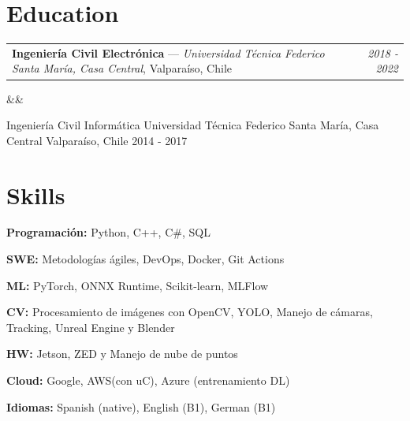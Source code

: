 \documentclass[11pt, letterpaper]{article}
\makeatletter
\newcommand{\project}[4]{%
  \noindent
  \begin{tabularx}{\linewidth}{@{}X r@{}}
    \textbf{#1} \hspace{4pt}{\small\textit{#2}} & \textit{#3}
  \end{tabularx}
  \vspace{0pt}
  #4
  \vspace{0pt}
}
\newcommand{\education}[5]{%
  \noindent
  \begin{tabularx}{\linewidth}{@{}X r@{}}
    \textbf{#1} — \textit{#2}, #3 & \textit{#4}
  \end{tabularx}
  \ifx&#5&\else{\small #5}\fi
  \vspace{0pt}
}
\newcommand{\skillgroup}[2]{%
  \noindent\textbf{#1:} #2\par\vspace{0pt}
}
\makeatother
\begin{document}
%

\section{Education}

\education
  {Ingeniería Civil Electrónica}
  {Universidad Técnica Federico Santa María, Casa Central}
  {Valparaíso, Chile}
  {2018 - 2022}

\education
  {Ingeniería Civil Informática}
  {Universidad Técnica Federico Santa María, Casa Central}
  {Valparaíso, Chile}
  {2014 - 2017}

\section{Skills}
\skillgroup{Programación}{Python, C++, C#, SQL}
\skillgroup{SWE}{Metodologías ágiles, DevOps, Docker, Git Actions}
\skillgroup{ML}{PyTorch, ONNX Runtime, Scikit-learn, MLFlow}
\skillgroup{CV}{Procesamiento de imágenes con OpenCV, YOLO, Manejo de cámaras, Tracking, Unreal Engine y Blender}
\skillgroup{HW}{Jetson, ZED y Manejo de nube de puntos}
\skillgroup{Cloud}{Google, AWS(con uC), Azure (entrenamiento DL)}
\skillgroup{Idiomas}{Spanish (native), English (B1), German (B1)}
\end{document}
